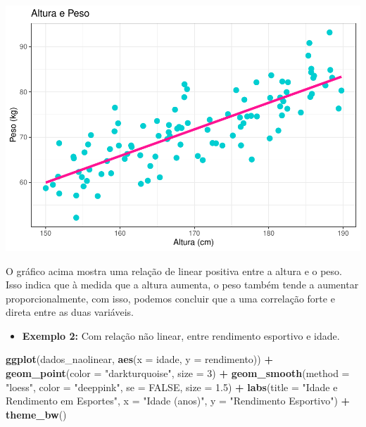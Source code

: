 \documentclass[
]{book}
\newenvironment{Shaded}{\begin{snugshade}}{\end{snugshade}}
\newcommand{\AttributeTok}[1]{\textcolor[rgb]{0.13,0.29,0.53}{#1}}
\newcommand{\ConstantTok}[1]{\textcolor[rgb]{0.56,0.35,0.01}{#1}}
\newcommand{\DecValTok}[1]{\textcolor[rgb]{0.00,0.00,0.81}{#1}}
\newcommand{\FloatTok}[1]{\textcolor[rgb]{0.00,0.00,0.81}{#1}}
\newcommand{\FunctionTok}[1]{\textcolor[rgb]{0.13,0.29,0.53}{\textbf{#1}}}
\newcommand{\NormalTok}[1]{#1}
\newcommand{\SpecialCharTok}[1]{\textcolor[rgb]{0.81,0.36,0.00}{\textbf{#1}}}
\newcommand{\StringTok}[1]{\textcolor[rgb]{0.31,0.60,0.02}{#1}}
\providecommand{\tightlist}{%
  \setlength{\itemsep}{0pt}\setlength{\parskip}{0pt}}
\begin{document}
\begin{center}\includegraphics{AED_files/figure-latex/graf_dispersao1-1} \end{center}

O gráfico acima mostra uma relação de linear positiva entre a altura e o peso. Isso indica que à medida que a altura aumenta, o peso também tende a aumentar proporcionalmente, com isso, podemos concluir que a uma correlação forte e direta entre as duas variáveis.

\begin{itemize}
\tightlist
\item
  \textbf{Exemplo 2:} Com relação não linear, entre rendimento esportivo e idade.
\end{itemize}

\begin{Shaded}
\begin{Highlighting}[]
\FunctionTok{ggplot}\NormalTok{(dados\_naolinear, }\FunctionTok{aes}\NormalTok{(}\AttributeTok{x =}\NormalTok{ idade, }\AttributeTok{y =}\NormalTok{ rendimento)) }\SpecialCharTok{+}
  \FunctionTok{geom\_point}\NormalTok{(}\AttributeTok{color =} \StringTok{"darkturquoise"}\NormalTok{, }\AttributeTok{size =} \DecValTok{3}\NormalTok{) }\SpecialCharTok{+}
  \FunctionTok{geom\_smooth}\NormalTok{(}\AttributeTok{method =} \StringTok{"loess"}\NormalTok{, }\AttributeTok{color =} \StringTok{"deeppink"}\NormalTok{, }\AttributeTok{se =} \ConstantTok{FALSE}\NormalTok{, }\AttributeTok{size =} \FloatTok{1.5}\NormalTok{) }\SpecialCharTok{+} 
  \FunctionTok{labs}\NormalTok{(}\AttributeTok{title =} \StringTok{"Idade e Rendimento em Esportes"}\NormalTok{,}
       \AttributeTok{x =} \StringTok{"Idade (anos)"}\NormalTok{,}
       \AttributeTok{y =} \StringTok{"Rendimento Esportivo"}\NormalTok{) }\SpecialCharTok{+}
  \FunctionTok{theme\_bw}\NormalTok{()}
\end{Highlighting}
\end{Shaded}
\end{document}
